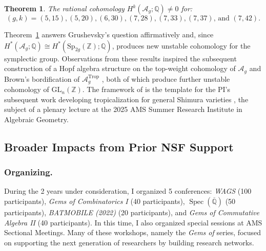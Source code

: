 \documentclass[11pt,reqno]{amsart}
\newtheorem{theorem}[lemma]{Theorem}
\theoremstyle{remark}
\newcommand{\Spec}{\operatorname{Spec}}
\newcommand{\QQ}{\mathbb{Q}}
\newcommand{\ZZ}{\mathbb{Z}}
\newcommand{\cA}{\mathcal{A}}
\DeclareMathOperator{\trop}{Trop}
\begin{document}
\begin{theorem}\cite[Theorem A]{BBCMMW24}\label{thm:Ag}
The rational cohomology $H^{k}\left(\cA_{g};\QQ\right)\neq0$ for:
\[
\text{$(g,k)=(5,15),(5,20),(6,30),(7,28),(7,33),(7,37)$, and $(7,42)$}.
\]
\end{theorem}

Theorem~\ref{thm:Ag} answers Grushevsky's question affirmatively and, since $H^*(\cA_g;\QQ) \cong H^*(\mathrm{Sp}_{2g}(\ZZ);\QQ)$, produces new unstable cohomology for the symplectic group. Observations from these results inspired the subsequent construction of a Hopf algebra structure on the top-weight cohomology of $\cA_{g}$ \cite{BCGP24} and Brown's bordification of $\cA_g^{\trop}$ \cite{Brown23}, both of which produce further
unstable cohomology of $\mathrm{GL}_n(\ZZ)$. The framework of \cite{BBCMMW24} is the template for the PI's subsequent work developing tropicalization for general Shimura varieties \cite{ABBCV25}, the subject of a plenary lecture at the 2025 AMS Summer Research Institute in Algebraic Geometry. 

 
\subsection{Broader Impacts from Prior NSF Support}

\subsubsection{Organizing.}\label{subsubsec:prior-organizing} During the 2 years under consideration, I organized 5 conferences: \textit{WAGS} (100 participants), \textit{Gems of Combinatorics I} (40 participants), $\Spec(\overline{\QQ})$ (50 participants), \textit{BATMOBILE (2022)} (20 participants), and \textit{Gems of Commutative Algebra II} (40 participants). In this time, I also organized special sessions at AMS Sectional Meetings. Many of these workshops, namely the \textit{Gems of} series, focused on supporting the next generation of researchers by building research networks.

\end{document}
